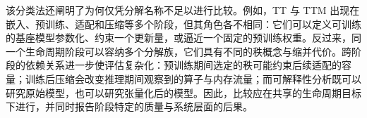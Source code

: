 该分类法还阐明了为何仅凭分解名称不足以进行比较。例如，TT 与 TTM 出现在嵌入、预训练、适配和压缩等多个阶段，但其角色各不相同：它们可以定义可训练的基座模型参数化、约束一个更新量，或逼近一个固定的预训练权重。反过来，同一个生命周期阶段可以容纳多个分解族，它们具有不同的秩概念与缩并代价。跨阶段的依赖关系进一步使评估复杂化：预训练期间选定的秩可能约束后续适配的容量；训练后压缩会改变推理期间观察到的算子与内存流量；而可解释性分析既可以研究原始模型，也可以研究张量化后的模型。因此，比较应在共享的生命周期目标下进行，并同时报告阶段特定的质量与系统层面的后果。



